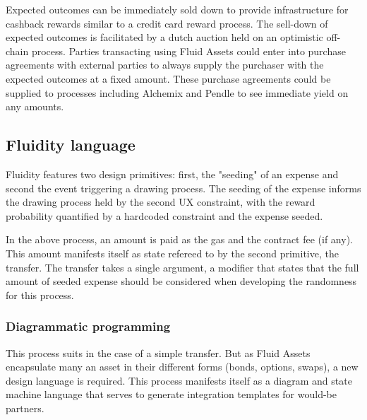 Expected outcomes can be immediately sold down to provide infrastructure for cashback rewards similar to a credit card reward process. The sell-down of expected outcomes is facilitated by a dutch auction held on an optimistic off-chain process. Parties transacting using Fluid Assets could enter into purchase agreements with external parties to always supply the purchaser with the expected outcomes at a fixed amount. These purchase agreements could be supplied to processes including Alchemix \cite{alchemix} and Pendle \cite{pendle} to see immediate yield on any amounts.

\subsection{Fluidity language}

Fluidity features two design primitives: first, the "seeding" of an expense and second the event triggering a drawing process. The seeding of the expense informs the drawing process held by the second UX constraint, with the reward probability quantified by a hardcoded constraint and the expense seeded.

In the above process, an amount is paid as the gas and the contract fee (if any). This amount manifests itself as state refereed to by the second primitive, the transfer. The transfer takes a single argument, a modifier that states that the full amount of seeded expense should be considered when developing the randomness for this process.

\subsubsection{Diagrammatic programming}

This process suits in the case of a simple transfer. But as Fluid Assets encapsulate many an asset in their different forms (bonds, options, swaps), a new design language is required. This process manifests itself as a diagram and state machine language that serves to generate integration templates for would-be partners.

